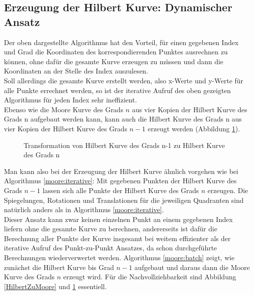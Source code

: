 \documentclass[course=erap]{aspdoc}
\begin{document}
\FloatBarrier
\subsection{Erzeugung der Hilbert Kurve: Dynamischer Ansatz}
Der oben dargestellte Algorithmus hat den Vorteil, für einen gegebenen Index und Grad die Koordinaten des korrespondierenden Punktes ausrechnen zu können, ohne dafür die gesamte Kurve erzeugen zu müssen und dann die Koordinaten an der Stelle des Index auszulesen.\\ 
Soll allerdings die gesamte Kurve erstellt werden, also x-Werte und y-Werte für alle Punkte errechnet werden, so ist der iterative Aufruf des oben gezeigten Algorithmus für jeden Index sehr ineffizient.\\
Ebenso wie die Moore Kurve des Grads $n$ aus vier Kopien der Hilbert Kurve des Grads n aufgebaut werden kann, kann auch die Hilbert Kurve des Grads n aus vier Kopien der Hilbert Kurve des Grads $n-1$ erzeugt werden (Abbildung \ref{HilbertZuHilbert}).
\begin{figure}[h]
\centering
\def\svgwidth{240pt}

\caption{Transformation von Hilbert Kurve des Grads n-1 zu Hilbert Kurve des Grads n}
\label{HilbertZuHilbert}
\end{figure}
Man kann also bei der Erzeugung der Hilbert Kurve ähnlich vorgehen wie bei Algorithmus \ref{moore:iterative}: Mit gegebenen Punkten der Hilbert Kurve des Grads $n-1$ lassen sich alle Punkte der Hilbert Kurve des Grads $n$ erzeugen. 
Die Spiegelungen, Rotationen und Translationen für die jeweiligen Quadranten sind natürlich anders als in Algorithmus \ref{moore:iterative}. \\
Dieser Ansatz kann zwar keinen einzelnen Punkt an einem gegebenen Index liefern ohne die gesamte Kurve zu berechnen, andererseits ist dafür die Berechnung aller Punkte der Kurve insgesamt bei weitem effizienter als der iterative Aufruf des Punkt-zu-Punkt Ansatzes, da schon durchgeführte Berechnungen wiederverwertet werden. Algorithmus \ref{moore:batch} zeigt, wie zunächst die Hilbert Kurve bis Grad $n-1$ aufgebaut und daraus dann die Moore Kurve des Grads $n$ erzeugt wird. Für die Nachvollziehbarkeit sind Abbildung \ref{HilbertZuMoore} und \ref{HilbertZuHilbert} essentiell.


\FloatBarrier
\end{document}
